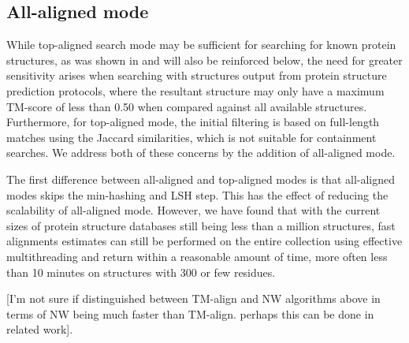 \documentclass[10pt,letterpaper]{article}
\begin{document}
\subsection*{All-aligned mode}

While top-aligned search mode may be sufficient for searching for known protein structures, as was shown in \cite{Ayoub2019} and will also be reinforced below, the need for greater sensitivity arises when searching with structures output from protein structure prediction protocols, where the resultant structure may only have a maximum TM-score of less than 0.50 when compared against all available structures.
Furthermore, for top-aligned mode, the initial filtering is based on full-length matches using the Jaccard similarities, which is not suitable for containment searches. We address both of these concerns by the addition of all-aligned mode. 

The first difference between all-aligned and top-aligned modes is that all-aligned modes skips the min-hashing and LSH step. 
This has the effect of reducing the scalability of all-aligned mode. 
However, we have found that with the current sizes of protein structure databases still being less than a million structures, fast alignments estimates can still be performed on the entire collection using effective multithreading and return within a reasonable amount of time, more often less than 10 minutes on structures with 300 or few residues. 

[I'm not sure if distinguished between TM-align and NW algorithms above in terms of NW being much faster than TM-align.
perhaps this can be done in related work].
\end{document}
